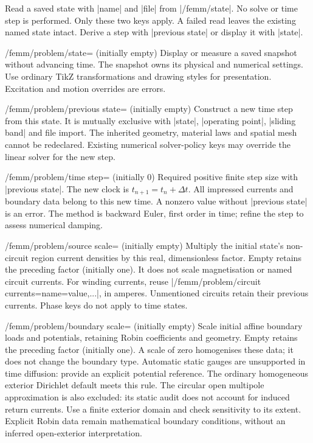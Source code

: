 \begin{command}{\femmrestorestate{}}
Read a saved state with |name| and |file| from |/femm/state|. No solve or time step
is performed. Only these two keys apply. A failed read leaves the existing named
state intact. Derive a step with |previous state| or display it with |state|.
\end{command}
\begin{key}{/femm/problem/state= (initially empty)}
Display or measure a saved snapshot without advancing time. The snapshot owns
its physical and numerical settings. Use ordinary TikZ transformations and
drawing styles for presentation. Excitation and motion overrides are errors.
\end{key}
\begin{key}{/femm/problem/previous state= (initially empty)}
Construct a new time step from this state. It is mutually exclusive with |state|,
|operating point|, |sliding band| and file import. The inherited geometry, material
laws and spatial mesh cannot be redeclared. Existing numerical solver-policy
keys may override the linear solver for the new step.
\end{key}
\begin{key}{/femm/problem/time step= (initially 0)}
Required positive finite step size with |previous state|. The new clock is
$t_{n+1}=t_n+\Delta t$. All impressed currents and boundary data belong to this
new time. A nonzero value without |previous state| is an error. The method is
backward Euler, first order in time; refine the step to assess numerical damping.
\end{key}
\begin{key}{/femm/problem/source scale= (initially empty)}
Multiply the initial state's non-circuit region current densities by this real,
dimensionless factor. Empty retains the preceding factor (initially one).
It does not scale magnetisation or named circuit currents. For winding currents,
reuse |/femm/problem/circuit currents={name=value,...}|, in amperes. Unmentioned
circuits retain their previous currents. Phase keys do not apply to time states.
\end{key}
\begin{key}{/femm/problem/boundary scale= (initially empty)}
Scale initial affine boundary loads and potentials, retaining Robin coefficients
and geometry. Empty retains the preceding factor (initially one). A scale of
zero homogenises these data; it does not change the boundary type. Automatic
static gauges are unsupported in time diffusion: provide an explicit potential
reference. The ordinary homogeneous exterior Dirichlet default meets this rule.
The circular open multipole approximation is also excluded: its static audit
does not account for induced return currents. Use a finite exterior domain and
check sensitivity to its extent. Explicit Robin data remain mathematical
boundary conditions, without an inferred open-exterior interpretation.
\end{key}

